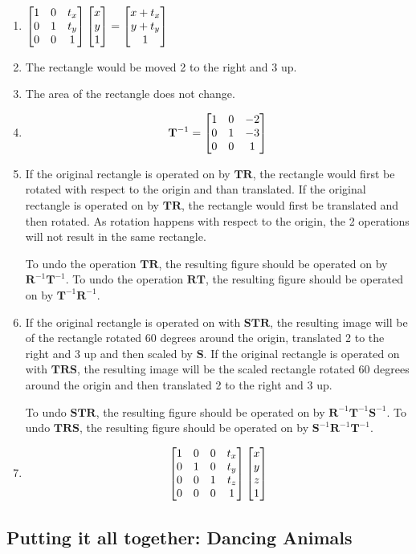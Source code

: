\begin{sol}
	\begin{enumerate}
		\item $\begin{bmatrix} 1 & 0 & t_x \\ 0 & 1 & t_y \\ 0 & 0 & 1 \end{bmatrix}\begin{bmatrix} x \\ y \\ 1 \end{bmatrix} = \begin{bmatrix} x + t_x \\ y + t_y \\ 1 \end{bmatrix} $
		\item The rectangle would be moved 2 to the right and 3 up.
		\item The area of the rectangle does not change.
		\item $$\mathbf{T}^{-1} = \begin{bmatrix} 1 & 0 & -2 \\ 0 & 1 & -3 \\ 0 & 0 & 1 \end{bmatrix}$$
		\item If the original rectangle is operated on by $\mathbf{TR}$, the rectangle would first be rotated with respect to the origin and than translated. If the original rectangle is operated on by $\mathbf{TR}$, the rectangle would first be translated and then rotated. As rotation happens with respect to the origin, the 2 operations will not result in the same rectangle.
		
		To undo the operation $\mathbf{TR}$, the resulting figure should be operated on by $\mathbf{R}^{-1}\mathbf{T}^{-1}$. To undo the operation $\mathbf{RT}$, the resulting figure should be operated on by $\mathbf{T}^{-1}\mathbf{R}^{-1}$.
		\item If the original rectangle is operated on with $\mathbf{STR}$, the resulting image will be of the rectangle rotated 60 degrees around the origin, translated 2 to the right and 3 up and then scaled by $\mathbf{S}$. If the original rectangle is operated on with $\mathbf{TRS}$, the resulting image will be the scaled rectangle rotated 60 degrees around the origin and then translated 2 to the right and 3 up.
		
		To undo $\mathbf{STR}$, the resulting figure should be operated on by $\mathbf{R}^{-1}\mathbf{T}^{-1}\mathbf{S}^{-1}$. To undo $\mathbf{TRS}$, the resulting figure should be operated on by $\mathbf{S}^{-1}\mathbf{R}^{-1}\mathbf{T}^{-1}$.
		\item $$
			\begin{bmatrix}
			1 & 0 & 0 & t_x  \\
			0 & 1 & 0 & t_y \\
			0 & 0 & 1 & t_z \\
			0 & 0 & 0 & 1 \\
			\end{bmatrix}
			\begin{bmatrix} x \\ y \\ z \\ 1 \end{bmatrix}$$
	\end{enumerate}
\end{sol}


\subsection{Putting it all together: Dancing Animals}

